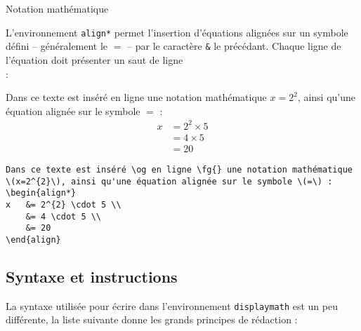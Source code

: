 \documentclass[a4paper, 11pt, twoside, fleqn]{memoir}
\begin{document}
\begin{exemple}{Notation mathématique}{}

L'environnement \texttt{align*} permet l'insertion d'équations alignées sur un symbole défini -- généralement le \(=\) -- par le caractère \texttt{\&} le précédant. Chaque ligne de l'équation doit présenter un saut de ligne \texttt{\\} :

\begin{minipage}[t]{0.49\linewidth}
Dans ce texte est inséré \og en ligne \fg{} une notation mathématique \(x=2^{2}\), ainsi qu'une équation alignée sur le symbole \(=\) :
\begin{align*}
x 	&= 2^{2} \times 5 \\
	&= 4 \times 5 \\
	&= 20
\end{align*}
\end{minipage}
\hfill
\begin{minipage}[t]{0.49\linewidth}
\begin{verbatim}
Dans ce texte est inséré \og en ligne \fg{} une notation mathématique \(x=2^{2}\), ainsi qu'une équation alignée sur le symbole \(=\) :
\begin{align*}
x	&= 2^{2} \cdot 5 \\
	&= 4 \cdot 5 \\
	&= 20
\end{align}
\end{verbatim}
\end{minipage}

\end{exemple}

		\subsection{Syntaxe et instructions}
		
		La syntaxe utilisée pour écrire dans l'environnement \texttt{displaymath} est un peu différente, la liste suivante donne les grands principes de rédaction :
		
\end{document}
